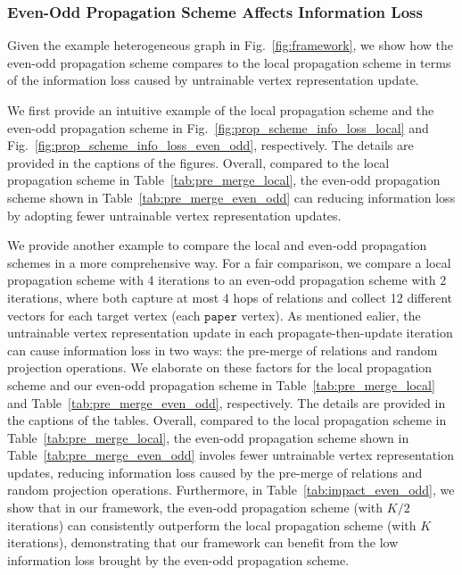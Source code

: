 \documentclass[lettersize,journal]{IEEEtran}
\begin{document}
\subsubsection{Even-Odd Propagation Scheme Affects Information Loss}\label{sec:assign_pre_merge}
Given the example heterogeneous graph in Fig.~\ref{fig:framework}, we show how the even-odd propagation scheme compares to the local propagation scheme in terms of the information loss caused by untrainable vertex representation update.

We first provide an intuitive example of the local propagation scheme and the even-odd propagation scheme in Fig.~\ref{fig:prop_scheme_info_loss_local} and Fig.~\ref{fig:prop_scheme_info_loss_even_odd}, respectively.
The details are provided in the captions of the figures.
Overall, compared to the local propagation scheme in Table~\ref{tab:pre_merge_local}, the even-odd propagation scheme shown in Table~\ref{tab:pre_merge_even_odd} can reducing information loss by adopting fewer untrainable vertex representation updates.


We provide another example to compare the local and even-odd propagation schemes in a more comprehensive way.
For a fair comparison, we compare a local propagation scheme with 4 iterations to an even-odd propagation scheme with 2 iterations, where both capture at most 4 hops of relations and collect 12 different vectors for each target vertex (each $\mathtt{paper}$ vertex).
As mentioned ealier, the untrainable vertex representation update in each propagate-then-update iteration can cause information loss in two ways: the pre-merge of relations and random projection operations.
We elaborate on these factors for the local propagation scheme and our even-odd propagation scheme in Table~\ref{tab:pre_merge_local} and Table~\ref{tab:pre_merge_even_odd}, respectively.
The details are provided in the captions of the tables.
Overall, compared to the local propagation scheme in Table~\ref{tab:pre_merge_local}, the even-odd propagation scheme shown in Table~\ref{tab:pre_merge_even_odd} involes fewer untrainable vertex representation updates, reducing information loss caused by the pre-merge of relations and random projection operations. 
Furthermore, in Table~\ref{tab:impact_even_odd}, we show that in our framework, the even-odd propagation scheme (with $K/2$ iterations) can consistently outperform the local propagation scheme (with $K$ iterations), demonstrating that our framework can benefit from the low information loss brought by the even-odd propagation scheme.
\end{document}
